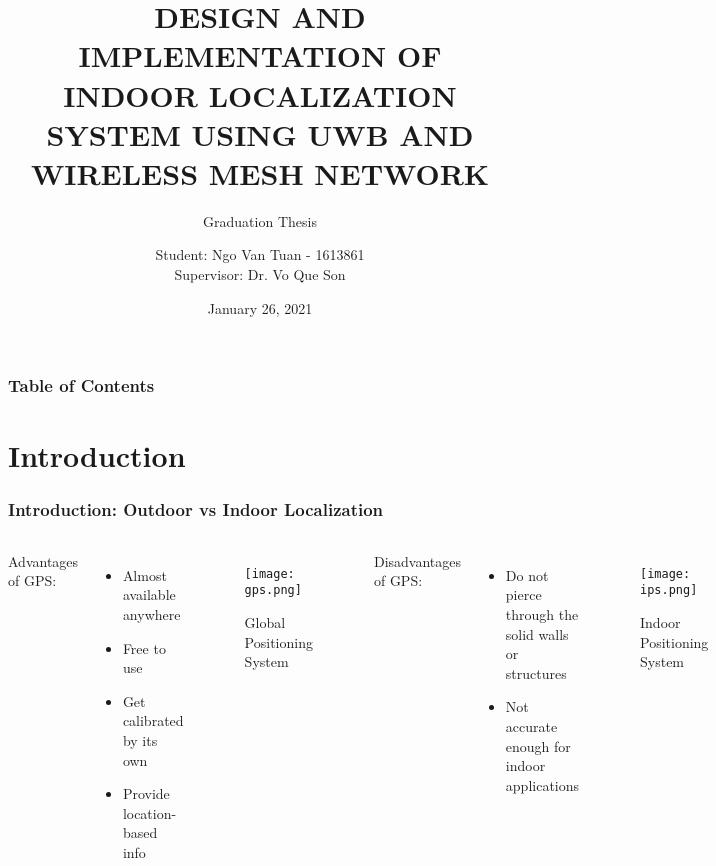\documentclass[10pt]{beamer}
\title[INDOOR LOCALIZATION SYSTEM]{DESIGN AND IMPLEMENTATION OF INDOOR LOCALIZATION SYSTEM USING UWB AND WIRELESS MESH NETWORK}
\subtitle{Graduation Thesis}
\author[Ngo Van Tuan - 1613861]{Student: Ngo Van Tuan - 1613861\\
Supervisor: Dr. Vo Que Son
}
\institute[HCMUT] %
{
  \inst{1}
  FACULTY OF ELECTRICAL AND ELECTRONICS  ENGINEERING\\
  DEPARTMENT OF TELECOMMUNICATIONS ENGINEERING
}
\date{January 26, 2021}
\begin{document}
\frame{\titlepage}

\begin{frame}
    \frametitle{Table of Contents}
    \tableofcontents
\end{frame}



\section{Introduction}

\begin{frame}
\frametitle{Introduction: Outdoor vs Indoor Localization}
\begin{columns}
Advantages of GPS:
\begin{itemize}
    \item Almost available anywhere
    \item Free to use
    \item Get calibrated by its own
    \item Provide location-based info
\end{itemize}
\begin{figure}[h]
    \begin{center}
        \texttt{[image: gps.png]}
    \end{center}
    \caption{Global Positioning System}
    \label{fig:gps}
\end{figure}
Disadvantages of GPS:
\begin{itemize}
    \item Do not pierce through the solid walls or structures
    \item Not accurate enough for indoor applications
\end{itemize}
\begin{figure}[h]
    \begin{center}
        \texttt{[image: ips.png]}
    \end{center}
    \caption{Indoor Positioning System}
    \label{fig:ips}
\end{figure}
\end{columns}
\end{frame}
\end{document}
